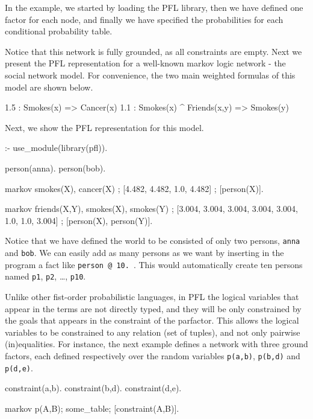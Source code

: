 \documentclass{article}
\begin{document}
In the example, we started by loading the PFL library, then we have defined one factor for each node, and finally we have specified the probabilities for each conditional probability table.

Notice that this network is fully grounded, as all constraints are empty. Next we present the PFL representation for a well-known markov logic network - the social network model. For convenience, the two main weighted formulas of this model are shown below.

\begin{pflcode}
1.5 : Smokes(x) => Cancer(x)
1.1 : Smokes(x) ^ Friends(x,y) => Smokes(y)
\end{pflcode}

Next, we show the PFL representation for this model.

\begin{pflcode}
:- use_module(library(pfl)).

person(anna).
person(bob).

markov smokes(X), cancer(X) ;
    [4.482, 4.482, 1.0, 4.482] ;
    [person(X)].

markov friends(X,Y), smokes(X), smokes(Y) ;
    [3.004, 3.004, 3.004, 3.004, 3.004, 1.0, 1.0, 3.004] ;
    [person(X), person(Y)].
\end{pflcode}

Notice that we have defined the world to be consisted of only two persons, \texttt{anna} and \texttt{bob}. We can easily add as many persons as we want by inserting in the program a fact like \texttt{person @ 10.}~. This would automatically create ten persons named \texttt{p1}, \texttt{p2}, \dots, \texttt{p10}.

Unlike other fist-order probabilistic languages, in PFL the logical variables that appear in the terms are not directly typed, and they will be only constrained by the goals that appears in the constraint of the parfactor. This allows the logical variables to be constrained to any relation (set of tuples), and not only pairwise (in)equalities. For instance, the next example defines a network with three ground factors, each defined respectively over the random variables \texttt{p(a,b)}, \texttt{p(b,d)} and \texttt{p(d,e)}.

\begin{pflcode}
constraint(a,b).
constraint(b,d).
constraint(d,e).

markov p(A,B); some_table; [constraint(A,B)].
\end{pflcode}
\end{document}
